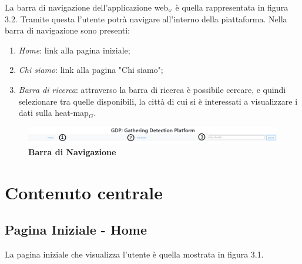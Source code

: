La barra di navigazione dell'applicazione web$_{\scaleto{G}{3pt}}$ è quella rappresentata in figura 3.2. Tramite questa l'utente potrà navigare all'interno della piattaforma. Nella barra di navigazione sono presenti:
\begin{enumerate}
	\item \textit{Home}: link alla pagina iniziale;
	\item \textit{Chi siamo}: link alla pagina "Chi siamo";
	\item \textit{Barra di ricerca}: attraverso la barra di ricerca è possibile cercare, e quindi selezionare tra quelle disponibili, la città di cui si è interessati a visualizzare i dati sulla heat-map$_G$. 
\end{enumerate}
\begin{center}
	\begin{figure}[H]
		\includegraphics[width=1\linewidth]{../immagini/manualeUtente/BarraDiNavigazioe.png}
		\caption{\textbf{Barra di Navigazione}}
	\end{figure}
\end{center}

\section{Contenuto centrale}\label{UtilizzoDiGDPGatheringDetecionPlatformContenutoCentrale}

\subsection{Pagina Iniziale - Home} \label{UtilizzoDiGDPGatheringDetecionPlatformContenutoCentralePaginaInizialeHome}
La pagina iniziale che visualizza l'utente è quella mostrata in figura 3.1.

